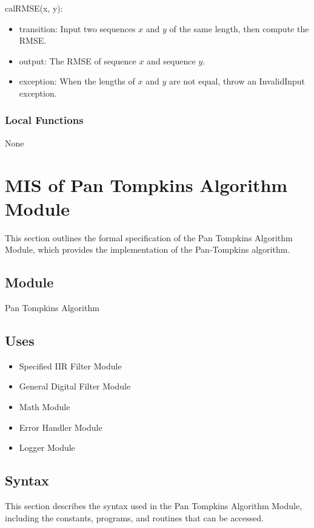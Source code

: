 \documentclass[12pt, titlepage]{article}
\begin{document}
\noindent calRMSE(x, y):
\begin{itemize}
\item transition: Input two sequences $x$ and $y$ of the same length, then
compute the RMSE.
\item output: The RMSE of sequence $x$ and sequence $y$.
\item exception: When the lengths of $x$ and $y$ are not equal, throw an
InvalidInput exception.
\end{itemize}

\subsubsection{Local Functions}

None

\newpage

\section{MIS of Pan Tompkins Algorithm Module} \label{MIS_Alg}

This section outlines the formal specification of the Pan Tompkins Algorithm
Module, which provides the implementation of the Pan-Tompkins algorithm.

\subsection{Module}

Pan Tompkins Algorithm

\subsection{Uses}

\begin{itemize}
\item Specified IIR Filter Module
\item General Digital Filter Module
\item Math Module
\item Error Handler Module
\item Logger Module
\end{itemize}

\subsection{Syntax}

This section describes the syntax used in the Pan Tompkins Algorithm Module,
including the constants, programs, and routines that can be accessed.
\end{document}
